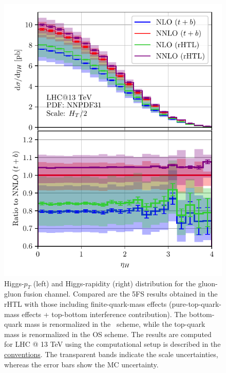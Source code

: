 \begin{figure}[ht]
\begin{minipage}[t]{0.49\textwidth}
  \includegraphics[width=\textwidth]{Images/yH_13000_bMS_tOS_cropped.pdf}
\end{minipage}
\caption{Higgs-$p_T$ (left) and Higgs-rapidity (right) distribution for the gluon-gluon fusion channel. Compared are the 5\acs{FS} results obtained in the \acs{rHTL} with those including finite-quark-mass effects (pure-top-quark-mass effects + top-bottom interference contribution). The bottom-quark mass is renormalized in the \MS\ scheme, while the top-quark mass is renormalized in the \acs{OS} scheme. The results are computed for LHC @ 13 TeV using the computational setup is described in the \hyperref[chap:notation_and_conventions]{conventions}. The transparent bands indicate the scale uncertainties, whereas the error bars show the \acs{MC} uncertainty.}
\label{fig:6:pT_yH_distributions}
\end{figure}

